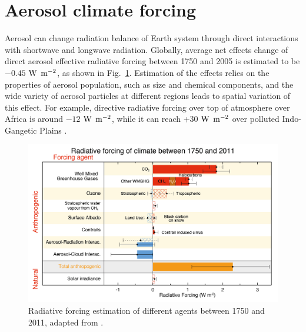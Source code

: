 \documentclass[edeposit,fullpage]{uiucthesis2009}
\begin{document}
\section{Aerosol climate forcing}
\label{cha1-2:aerosl-climate}
Aerosol can change radiation balance of Earth system through direct interactions with shortwave and longwave radiation. Globally, average net effects change of direct aerosol effective radiative forcing between 1750 and 2005 is estimated to be $-0.45$ $\rm W$ $\rm m^{-2}$, as shown in Fig.~\ref{fig:chap1-aerosol-climate}. Estimation of the effects relies on the properties of aerosol population, such as size and chemical components, and the wide variety of aerosol particles at different regions leads to spatial variation of this effect. For example, directive radiative forcing over top of atmosphere over Africa is around $-12$ $\rm W$ $\rm m^{-2}$, while it can reach +$30$ $\rm W$ $\rm m^{-2}$ over polluted Indo-Gangetic Plains \citep{subba2020recent}. 

\begin{figure}
	\centering
	\includegraphics[scale=0.80]{chap1_figs/thesis_chap1_fig1.jpeg}
	\caption{Radiative forcing estimation of different agents between 1750 and 2011, adapted from \cite{IPCC_CHAPTER8}.}
	\label{fig:chap1-aerosol-climate}
\end{figure}
\end{document}
